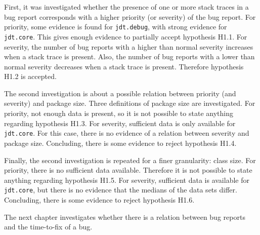 \noindent
First, it was investigated whether the presence of one or more stack traces in a bug report corresponds with a higher priority (or severity) of the bug report. For priority, some evidence is found for \texttt{jdt.debug}, with strong evidence for \texttt{jdt.core}. This gives enough evidence to partially accept hypothesis H1.1. For severity, the number of bug reports with a higher than normal severity increases when a stack trace is present. Also, the number of bug reports with a lower than normal severity decreases when a stack trace is present. Therefore hypothesis H1.2 is accepted.

The second investigation is about a possible relation between priority (and severity) and package size. Three definitions of package size are investigated. For priority, not enough data is present, so it is not possible to state anything regarding hypothesis H1.3. For severity, sufficient data is only available for \texttt{jdt.core}. For this case, there is no evidence of a relation between severity and package size. Concluding, there is some evidence to reject hypothesis H1.4.

Finally, the second investigation is repeated for a finer granularity: class size. For priority, there is no sufficient data available. Therefore it is not possible to state anything regarding hypothesis H1.5. For severity, sufficient data is available for \texttt{jdt.core}, but there is no evidence that the medians of the data sets differ. Concluding, there is some evidence to reject hypothesis H1.6.

The next chapter investigates whether there is a relation between bug reports and the time-to-fix of a bug.
